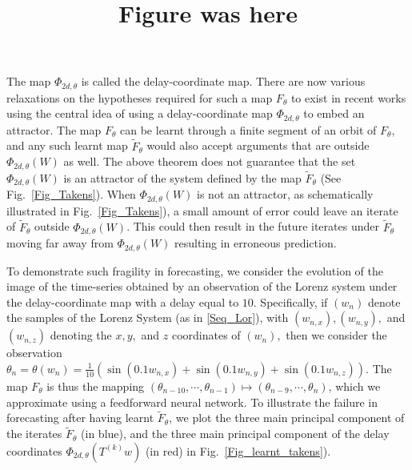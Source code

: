 \documentclass[12 pt]{article}
\begin{document}
The map $\Phi_{2d,\theta}$ is called the delay-coordinate map. 
There are now various relaxations on the hypotheses required for such a map $F_\theta$ to exist in recent works using the central idea of using a delay-coordinate map 
$\Phi_{2d,\theta}$ to embed an attractor. 
The map $F_\theta$ can be learnt through a finite segment of an orbit of $F_{\theta}$, and any such learnt map $\widetilde{F}_{\theta}$ would also accept arguments that are outside $\Phi_{2d,\theta}(W)$ as well. 
The above theorem does not guarantee that the set $\Phi_{2d,\theta}(W)$ is an attractor of the system defined by the map $\widetilde{F}_{\theta}$ (See Fig.~\ref{Fig_Takens}). 
When $\Phi_{2d,\theta}(W)$ is not an attractor, as schematically illustrated in Fig.~\ref{Fig_Takens}),  a small amount of error  could leave an iterate of $\widetilde{F}_{\theta}$  outside $\Phi_{2d,\theta}(W)$. This could then result in the future iterates under $\widetilde{F}_{\theta}$ moving far away from $\Phi_{2d,\theta}(W)$ resulting in erroneous prediction. 

To demonstrate such fragility in forecasting, we consider the evolution of the image of the time-series obtained by an observation of the Lorenz system under the delay-coordinate map with a delay equal to $10$. 
Specifically, if $(w_n)$ denote the samples of the Lorenz System (as in \eqref{Seq_Lor}), with $(w_{n,x}),(w_{n,y}),$ and $(w_{n,z})$ denoting the $x,y,$ and $z$ coordinates of $(w_n),$
then we consider the observation 
$\theta_n=\theta(w_n)=\frac{1}{10}(\sin(0.1w_{n,x})+\sin(0.1w_{n,y})+\sin(0.1w_{n,z})).$
The map $F_\theta$ is thus the mapping $(\theta_{n-10},\cdots,\theta_{n-1}) \mapsto (\theta_{n-9},\cdots,\theta_{n})$, which we approximate using a feedforward neural network.
To illustrate the failure in forecasting after having learnt $\widetilde{F}_{\theta}$, we plot the three main principal component of the iterates $\widetilde{F}_{\theta}$ (in blue), and the 
three main principal component of the delay coordinates $\Phi_{2d,\theta}(T^{(k)}w)$ (in red) in  Fig.~\ref{Fig_learnt_takens}). 
 



\title{Figure was here}
\end{document}
